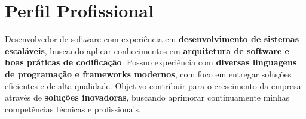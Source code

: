 \section{Perfil Profissional}

\small{
  Desenvolvedor de software com experiência em \textbf{desenvolvimento de sistemas escaláveis}, buscando aplicar conhecimentos em \textbf{arquitetura de software e boas práticas de codificação}. Possuo experiência com \textbf{diversas linguagens de programação e frameworks modernos}, com foco em entregar soluções eficientes e de alta qualidade. Objetivo contribuir para o crescimento da empresa através de \textbf{soluções inovadoras}, buscando aprimorar continuamente minhas competências técnicas e profissionais.
}